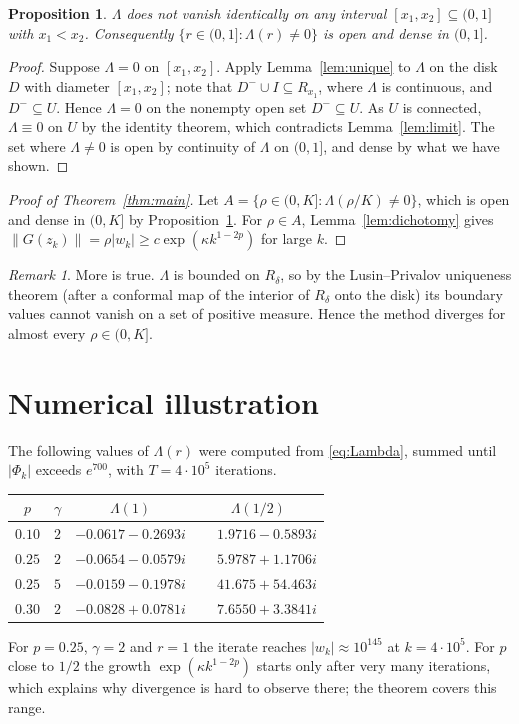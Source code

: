 \documentclass[11pt]{amsart}
\newtheorem{proposition}[theorem]{Proposition}
\theoremstyle{remark}
\newtheorem{remark}[theorem]{Remark}
\begin{document}
\begin{proposition}\label{prop:nonvanishing}
$\Lambda$ does not vanish identically on any interval $[x_1,x_2]\subseteq(0,1]$ with $x_1<x_2$.
Consequently $\{r\in(0,1]:\Lambda(r)\neq0\}$ is open and dense in $(0,1]$.
\end{proposition}

\begin{proof}
Suppose $\Lambda=0$ on $[x_1,x_2]$.
Apply Lemma~\ref{lem:unique} to $\Lambda$ on the disk $D$ with diameter $[x_1,x_2]$; note that $D^-\cup I\subseteq R_{x_1}$, where $\Lambda$ is continuous, and $D^-\subseteq U$.
Hence $\Lambda=0$ on the nonempty open set $D^-\subseteq U$.
As $U$ is connected, $\Lambda\equiv0$ on $U$ by the identity theorem, which contradicts Lemma~\ref{lem:limit}.
The set where $\Lambda\neq0$ is open by continuity of $\Lambda$ on $(0,1]$, and dense by what we have shown.
\end{proof}

\begin{proof}[Proof of Theorem~\ref{thm:main}]
Let $A=\{\rho\in(0,K]:\Lambda(\rho/K)\neq0\}$, which is open and dense in $(0,K]$ by Proposition~\ref{prop:nonvanishing}.
For $\rho\in A$, Lemma~\ref{lem:dichotomy} gives $\|G(z_k)\|=\rho|w_k|\ge c\exp(\kappa k^{1-2p})$ for large $k$.
\end{proof}

\begin{remark}
More is true.
$\Lambda$ is bounded on $R_\delta$, so by the Lusin--Privalov uniqueness theorem (after a conformal map of the interior of $R_\delta$ onto the disk) its boundary values cannot vanish on a set of positive measure.
Hence the method diverges for almost every $\rho\in(0,K]$.
\end{remark}

\section{Numerical illustration}\label{sec:numerics}

The following values of $\Lambda(r)$ were computed from \eqref{eq:Lambda}, summed until $|\Phi_k|$ exceeds $e^{700}$, with $T=4\cdot10^5$ iterations.
\begin{center}
\begin{tabular}{cccc}
\toprule
$p$ & $\gamma$ & $\Lambda(1)$ & $\Lambda(1/2)$\\
\midrule
$0.10$ & $2$ & $-0.0617-0.2693i$ & $\phantom{-}1.9716-0.5893i$\\
$0.25$ & $2$ & $-0.0654-0.0579i$ & $\phantom{-}5.9787+1.1706i$\\
$0.25$ & $5$ & $-0.0159-0.1978i$ & $\phantom{-}41.675+54.463i$\\
$0.30$ & $2$ & $-0.0828+0.0781i$ & $\phantom{-}7.6550+3.3841i$\\
\bottomrule
\end{tabular}
\end{center}
For $p=0.25$, $\gamma=2$ and $r=1$ the iterate reaches $|w_k|\approx10^{145}$ at $k=4\cdot10^5$.
For $p$ close to $1/2$ the growth $\exp(\kappa k^{1-2p})$ starts only after very many iterations, which explains why divergence is hard to observe there; the theorem covers this range.
\end{document}
